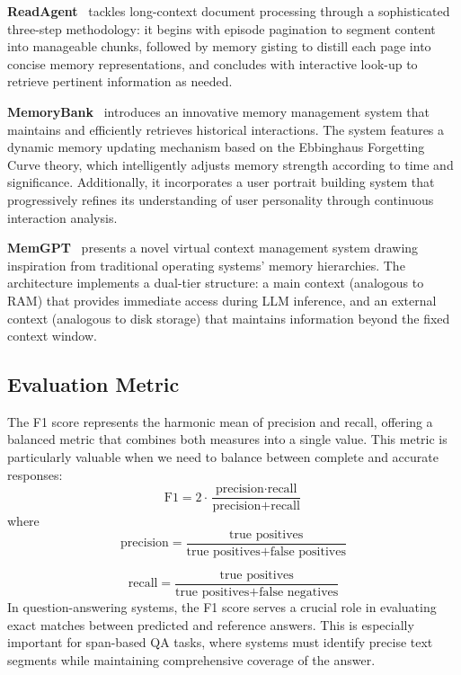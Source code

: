 \documentclass{article}
\begin{document}
\noindent \textbf{ReadAgent}~\cite{readagent} tackles long-context document processing through a sophisticated three-step methodology: it begins with episode pagination to segment content into manageable chunks, followed by memory gisting to distill each page into concise memory representations, and concludes with interactive look-up to retrieve pertinent information as needed.

\noindent \textbf{MemoryBank}~\cite{memorybank} introduces an innovative memory management system that maintains and efficiently retrieves historical interactions. The system features a dynamic memory updating mechanism based on the Ebbinghaus Forgetting Curve theory, which intelligently adjusts memory strength according to time and significance. Additionally, it incorporates a user portrait building system that progressively refines its understanding of user personality through continuous interaction analysis.

\noindent \textbf{MemGPT}~\cite{memgpt} presents a novel virtual context management system drawing inspiration from traditional operating systems' memory hierarchies. The architecture implements a dual-tier structure: a main context (analogous to RAM) that provides immediate access during LLM inference, and an external context (analogous to disk storage) that maintains information beyond the fixed context window.
\subsection{Evaluation Metric}
The F1 score represents the harmonic mean of precision and recall, offering a balanced metric that combines both measures into a single value. This metric is particularly valuable when we need to balance between complete and accurate responses:
\begin{equation}
    \text{F1} = 2 \cdot \frac{\text{precision} \cdot \text{recall}}{\text{precision} + \text{recall}}
\end{equation}
where 
\begin{equation}
    \text{precision} = \frac{\text{true positives}}{\text{true positives} + \text{false positives}}
\end{equation}

\begin{equation}
    \text{recall} = \frac{\text{true positives}}{\text{true positives} + \text{false negatives}}
\end{equation}
In question-answering systems, the F1 score serves a crucial role in evaluating exact matches between predicted and reference answers. This is especially important for span-based QA tasks, where systems must identify precise text segments while maintaining comprehensive coverage of the answer.
\end{document}

